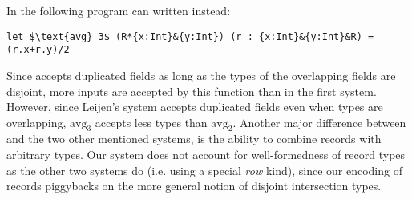 In \name the following program can written instead:
\begin{lstlisting}[mathescape=true]
let $\text{avg}_3$ (R*{x:Int}&{y:Int}) (r : {x:Int}&{y:Int}&R) = (r.x+r.y)/2 
\end{lstlisting}
Since \name accepts duplicated fields as long as the types of the
overlapping fields are disjoint, more inputs are accepted by this
function than in the first system. However, since Leijen's system
accepts duplicated fields even when types are overlapping, $\text{avg}_3$
accepts less types than $\text{avg}_2$. 
Another major difference between \name and the two other mentioned systems, is the ability to 
combine records with arbitrary types.
Our system does not account for well-formedness of record types as the other two systems do 
(i.e. using a special \emph{row} kind), since our encoding of records piggybacks on the more
general notion of disjoint intersection types. 

